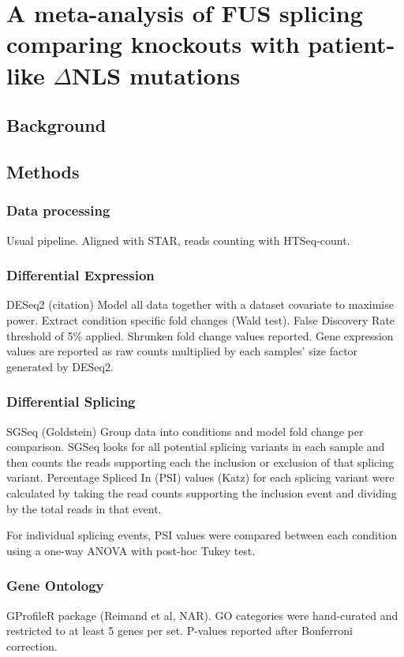 \chapter{A meta-analysis of FUS splicing comparing knockouts with patient-like $\Delta$NLS mutations}


\section{Background}


\section{Methods}

\subsection{Data processing}
Usual pipeline. Aligned with STAR, reads counting with HTSeq-count. 

\subsection{Differential Expression}
DESeq2 (citation)
Model all data together with a dataset covariate to maximise power.
Extract condition specific fold changes (Wald test). False Discovery Rate threshold of 5\% applied. Shrunken fold change values reported. Gene expression values are reported as raw counts multiplied by each samples’ size factor generated by DESeq2.

\subsection{Differential Splicing}
SGSeq (Goldstein)
Group data into conditions and model fold change per comparison. SGSeq looks for all potential splicing variants in each sample and then counts the reads supporting each the inclusion or exclusion of that splicing variant. 
Percentage Spliced In (PSI) values (Katz) for each splicing variant were calculated by taking the read counts supporting the inclusion event and dividing by the total reads in that event. 

For individual splicing events, PSI values were compared between each condition using a one-way ANOVA with post-hoc Tukey test.

\subsection{Gene Ontology}
GProfileR package (Reimand et al, NAR). GO categories were hand-curated and restricted to at least 5 genes per set. P-values reported after Bonferroni correction. 

